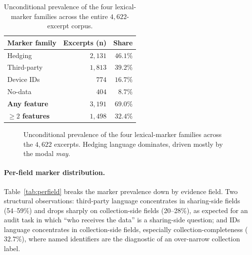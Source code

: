\documentclass[11pt,a4paper]{article}
\begin{document}
\begin{table}[t]
\centering\small
\caption{Unconditional prevalence of the four lexical-marker families
across the entire $4{,}622$-excerpt corpus.}
\label{tab:uncond}
\begin{tabular}{lrr}
\toprule
Marker family & Excerpts (n) & Share \\
\midrule
Hedging        & $2{,}131$ & $46.1\%$ \\
Third-party    & $1{,}813$ & $39.2\%$ \\
Device IDs     & $\phantom{1{,}}774$ & $16.7\%$ \\
No-data        & $\phantom{1{,}}404$ & $\phantom{1}8.7\%$ \\
\midrule
\textbf{Any feature}     & $3{,}191$ & $\mathbf{69.0\%}$ \\
\textbf{$\geq 2$ features} & $1{,}498$ & $\mathbf{32.4\%}$ \\
\bottomrule
\end{tabular}
\end{table}

\begin{figure}[t]
\centering
{}
\caption{Unconditional prevalence of the four lexical-marker families
across the $4{,}622$ excerpts. Hedging language dominates,
driven mostly by the modal \emph{may}.}
\label{fig:uncond}
\end{figure}

\paragraph{Per-field marker distribution.}
Table~\ref{tab:perfield} breaks the marker prevalence down by
evidence field. Two structural observations: third-party language
concentrates in sharing-side fields (54--59\%) and drops sharply on
collection-side fields (20--28\%), as expected for an audit task in
which ``who receives the data'' is a sharing-side question; and IDs
language concentrates in collection-side fields, especially
collection-completeness ($32.7\%$), where named identifiers are the
diagnostic of an over-narrow collection label.
\end{document}
